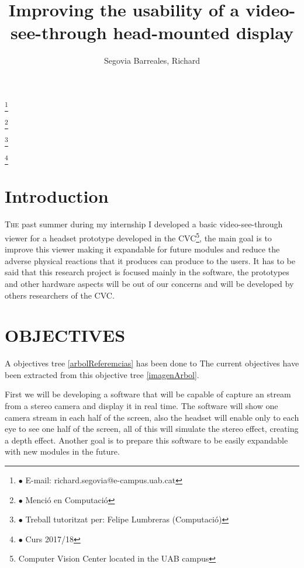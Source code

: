 \documentclass[10pt,a4paper,twocolumn,twoside]{article}
\author{\LARGE\sffamily Segovia Barreales, Richard}
\title{\Huge{\sffamily Improving the usability of a video-see-through head-mounted display}}
\date{}
\newcommand\blfootnote[1]{%
  \begingroup
  \renewcommand\thefootnote{}\footnote{#1}%
  \addtocounter{footnote}{-1}%
  \endgroup
}
\begin{document}
\fancyhead[RO]{\thepage}
\fancyhead[LE]{\thepage}

\fancyfoot[CO,CE]{}

{
   \fancyhf{}
}

\renewcommand{\headrulewidth}{0pt}
\renewcommand{\footrulewidth}{0pt}
\pagestyle{fancy}

\maketitle

\thispagestyle{primerapagina}


\blfootnote{$\bullet$ E-mail: richard.segovia@e-campus.uab.cat}
\blfootnote{$\bullet$ Menció en Computació}
\blfootnote{$\bullet$ Treball tutoritzat per: Felipe Lumbreras (Computació)}
\blfootnote{$\bullet$ Curs 2017/18}

\section{Introduction}

\lettrine[lines=3]{T}{he} past summer during my internship I developed a basic video-see-through viewer for a headset prototype developed in the CVC\footnote{Computer Vision Center located in the UAB campus}, the main goal is to improve this viewer making it expandable for future modules and reduce the adverse physical reactions that it produces can produce to the users\cite{disconfortReview}. It has to be said that this research project is focused mainly in the software, the prototypes and other hardware aspects will be out of our concerns and will be developed by others researchers of the CVC.

\section{OBJECTIVES}

A objectives tree \ref{arbolReferemcias} has been done to  
The current objectives have been extracted from this objective tree \ref{imagenArbol}.

First we will be developing a software that will be capable of capture an stream from a stereo camera and display it in real time. The software will show one camera stream in each half of the screen, also the headset will enable only to each eye to see one half of the screen, all of this will simulate the stereo effect, creating a depth effect. Another goal is to prepare this software to be easily expandable with new modules in the future.
\end{document}
